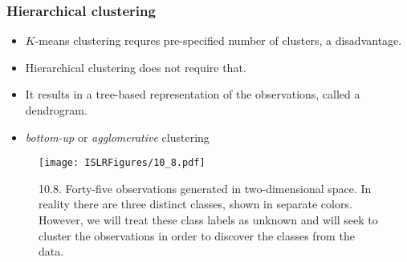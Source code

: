\documentclass{beamer}
\begin{document}
                  
                \begin{frame}
                	\frametitle{Hierarchical  clustering }
                	\begin{itemize}
                		\item  $K$-means clustering requres pre-specified number of clusters, a disadvantage.
                		 \item Hierarchical clustering   does not require that.
                		 \item It results in a tree-based representation of the
                		 observations, called a dendrogram.
                		 \item {\it  bottom-up } or {\it  agglomerative }
                		  clustering
                		 
                		
                	\end{itemize}
                \end{frame}   
                
              
                
                \begin{frame}
                	
                	\begin{figure}
                		\centering
                		
                		\centering
                		\texttt{[image: ISLRFigures/10\_8.pdf]}
                		\caption{\scriptsize 10.8. Forty-five observations generated in two-dimensional space. In
                			reality there are three distinct classes, shown in separate colors. However, we will
                			treat these class labels as unknown and will seek to cluster the observations in
                			order to discover the classes from the data.
                		}
                		
                		
                	\end{figure}
                \end{frame} 
                
\end{document}
